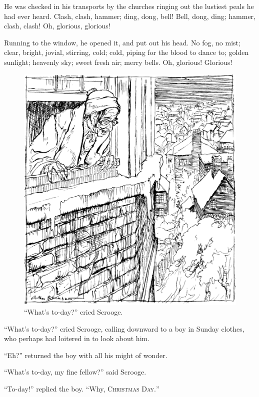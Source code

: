 \documentclass[paper=5.5in:8.5in,BCOR=7mm,twoside,DIV=calc,12pt,usegeometry]{scrbook} %
\begin{document}
He was checked in his transports by the churches ringing out the lustiest peals he had ever heard. Clash, clash, hammer; ding, dong, bell! Bell, dong, ding; hammer, clash, clash! Oh, glorious, glorious!

Running to the window, he opened it, and put out his head. No fog, no mist; clear, bright, jovial, stirring, cold; cold, piping for the blood to dance to; golden sunlight; heavenly sky; sweet fresh air; merry bells. Oh, glorious! Glorious!

\begin{figure}[tbph]
\begin{minipage}[c]{\linewidth}
\includegraphics[width=\linewidth]{whatday}
\caption*{\enquote{What's to-day?} cried Scrooge.}
\end{minipage}
\end{figure}

\enquote{What's to-day?} cried Scrooge, calling downward to a boy in Sunday clothes, who perhaps had loitered in to look about him.

\enquote{Eh?} returned the boy with all his might of wonder.

\enquote{What's to-day, my fine fellow?} said Scrooge.

\enquote{To-day!} replied the boy. \enquote{Why, \textsc{Christmas Day.}}
\end{document}
